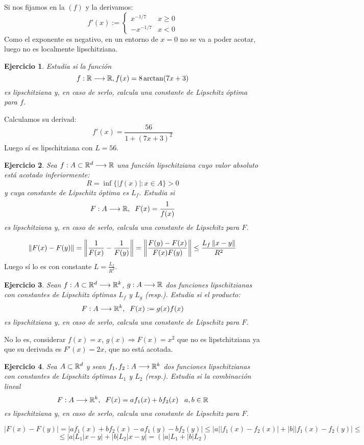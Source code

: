 \documentclass[12pt]{report}
\newtheorem{ejercicio}{Ejercicio}
\theoremstyle{definition}
\theoremstyle{remark}
\begin{document}
Si nos fijamos en la $(f)$ y la derivamos:
\[
f'(x):=\left\{
\begin{array}{cc}
x^{-1/7} & x \geq 0 \\
-x^{-1/7} & x < 0
\end{array}
\right.
\]
Como el exponente es negativo, en un entorno de $x=0$ no se va a poder acotar, luego no es localmente lipschitziana.

\begin{ejercicio}
Estudia si la función 
\[
f : \mathbb{R} \longrightarrow \mathbb{R}, f(x)=8\arctan(7x+3)
\]
es lipschitziana y, en caso de serlo,  calcula una constante de Lipschitz óptima para $f$.
\end{ejercicio}

Calculamos su derivad:
\[
f'(x)=\frac{56}{1+(7x+3)^2}
\]
Luego sí es lipschitziana con $L=56$.

\begin{ejercicio}
Sea $f : A\subset \mathbb{R}^d \longrightarrow \mathbb{R}$ una función lipschitziana cuyo valor absoluto está acotado inferiormente:
\[
R=\inf\{|f(x)|:x\in A\}>0
\]
y cuya constante de Lipschitz óptima es $L_f$. Estudia si
\[
F : A \longrightarrow \mathbb{R}, \;\; F(x)=\frac{1}{f(x)}
\]
es lipschitziana y, en caso de serlo, calcula una constante de Lipschitz para $F$.
\end{ejercicio}

\[
\left\lVert F(x)-F(y)\right\rVert=\left\lVert\frac{1}{F(x)}-\frac{1}{F(y)}\right\rVert=\left\lVert\frac{F(y)-F(x)}{F(x)F(y)}\right\rVert\leq \frac{L_f\left\lVert x-y\right\rVert}{R^2}
\]
Luego sí lo es con constante $L=\frac{L_f}{R^2}$.

\begin{ejercicio}
Sean $f : A\subset\mathbb{R}^d \longrightarrow \mathbb{R}^k$, $g : A \longrightarrow \mathbb{R}$ dos funciones lipschitzianas con constantes de Lipschitz óptimas $L_f$ y $L_g$ (resp.). Estudia si el producto:
\[
F : A \longrightarrow \mathbb{R}^k, \;\; F(x):=g(x)f(x)
\]
es lipschitziana y, en caso de serlo, calcula una constante de Lipschitz para $F$.
\end{ejercicio}

No lo es, considerar $f(x)=x$, $g(x) \Rightarrow F(x)=x^2$ que no es lipstchitziana ya que su derivada es $F'(x)=2x$, que no está acotada.

\begin{ejercicio}
Sea $A\subset\mathbb{R}^d$ y sean $f_1,f_2 : A \longrightarrow \mathbb{R}^k$ dos funciones lipschitzianas con constantes de Lipschitz óptimas $L_1$ y $L_2$ (resp.). Estudia si la combinación lineal
\[
F : A \longrightarrow \mathbb{R}^k, \;\; F(x)=af_1(x)+bf_2(x) \;\;\; a,b\in\mathbb{R}
\]
es lipschitziana y, en caso de serlo, calcula una constante de Lipschitz para $F$.
\end{ejercicio}
\[
|F(x)-F(y)|=|af_1(x)+bf_2(x)-af_1(y)-bf_2(y)|\leq|a||f_1(x)-f_2(x)|+|b||f_1(x)-f_2(y)|\leq
\]
\[
\leq|a|L_1|x-y|+|b|L_2|x-y|=(|a|L_1+|b|L_2)
\]
\end{document}
